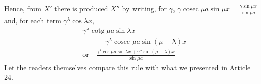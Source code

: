 Hence, from $X'$ there is produced $X''$ by writing, for $\gamma$, $\gamma\operatorname{cosec}\mu a\sin\mu x=\frac{\gamma\sin\mu x}{\sin\mu a}$ and, for each term $\gamma^{\lambda}\cos\lambda x$,
\[
\begin{aligned}
&\gamma^{\lambda}\operatorname{cotg}\mu a\sin\lambda x\\[5pt]
&\qquad{}+\gamma^{\lambda}\operatorname{cosec}\mu a\sin(\mu-\lambda)x
\\[5pt]
&\text{or}\quad
\frac{\gamma^{\lambda}\cos\mu a\sin\lambda x+\gamma^{\lambda}\sin(\mu-\lambda)x}{\sin\mu a}
\end{aligned}
\]
Let the readers themselves compare this rule with what we presented in Article 24.

\endgroup
